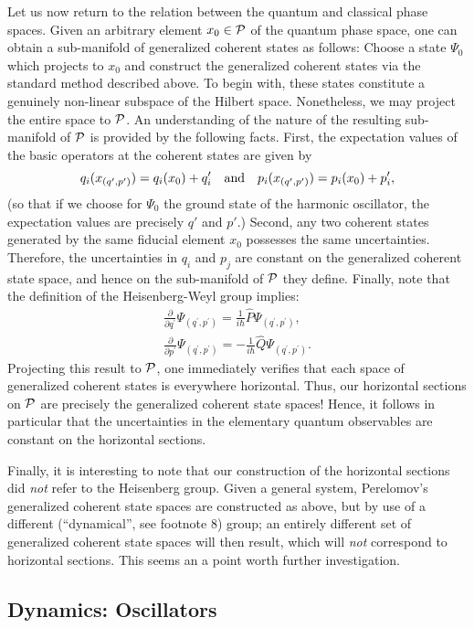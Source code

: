 \documentclass[12pt,aps,eqsecnum,tighten]{revtex4-2}
\def\be{\begin{equation}}
\def\ee{\end{equation}}
\def\ba{\begin{eqnarray}}
\def\ea{\end{eqnarray}}
\def\i{{i}}
\def\P{{\cal P}}
\begin{document}
Let us now return to the relation between the quantum and classical
phase spaces. Given an arbitrary element $x_0 \in \P$ of the quantum
phase space, one can obtain a sub-manifold of generalized coherent
states as follows: Choose a state $\Psi_0$ which projects to $x_0$ and
construct the generalized coherent states via the standard method
described above. To begin with, these states constitute a genuinely
non-linear subspace of the Hilbert space. Nonetheless, we may project
the entire space to $\P$. An understanding of the nature of the
resulting sub-manifold of $\P$ is provided by the following
facts. First, the expectation values of the basic operators at the
coherent states are given by
%
\be
  q_i( x_{(q^\prime, p^\prime)} ) = q_i( x_0 ) + q^\prime_i
	\quad {\rm and} \quad
  p_i( x_{(q^\prime, p^\prime)} ) = p_i( x_0 ) + p^\prime_i,
\ee
%
(so that if we choose for $\Psi_0$ the ground state of the harmonic
oscillator, the expectation values are precisely $q'$ and $p'$.)
Second, any two coherent states generated by the same fiducial element
$x_0$ possesses the same uncertainties. Therefore, the uncertainties
in $q_i$ and $p_j$ are constant on the generalized coherent state
space, and hence on the sub-manifold of $\P$ they define. Finally, 
note that the definition of the Heisenberg-Weyl group
implies:
%
\ba \frac{\partial}{\partial q^\prime}
\Psi_{(q^\prime, p^\prime)} = \frac{1}{\i\hbar} \hat{P}
\Psi_{(q^\prime, p^\prime)}, \\ \frac{\partial}{\partial p^\prime}
\Psi_{(q^\prime, p^\prime)} = - \frac{1}{\i\hbar} \hat{Q}
\Psi_{(q^\prime, p^\prime)}.  
\ea 
%
Projecting this result to $\P$, one immediately verifies that each
space of generalized coherent states is everywhere horizontal. Thus,
our horizontal sections on $\P$ are precisely the generalized coherent
state spaces! Hence, it follows in particular that the uncertainties
in the elementary quantum observables are constant on the horizontal
sections.

Finally, it is interesting to note that our construction of the
horizontal sections did {\em not} refer to the Heisenberg group.
Given a general system, Perelomov's generalized coherent state spaces
are constructed as above, but by use of a different (``dynamical'',
see footnote 8) group; an entirely different set of
generalized coherent state spaces will then result, which will {\em
not} correspond to horizontal sections.  This seems an a point worth
further investigation.


\subsection{Dynamics: Oscillators} \label{sec4.B}
\end{document}
